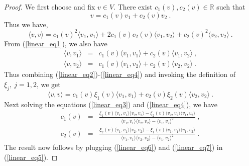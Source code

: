\documentclass[12pt]{amsart}
\theoremstyle{definition}
\newcommand{\R}{\mathbb R}%
\numberwithin{equation}{section}
\begin{document}
\begin{proof}
We first choose and fix $v \in V$. There exist $c_1(v),c_2(v) \in \R$ such that
\begin{equation}  \label{linear_eq1}
v=c_1(v)v_1+c_2(v)v_2\:.
\end{equation}
Thus we have,
\begin{equation} \label{linear_eq2}
\langle v,v \rangle = c_1(v)^2 \langle v_1,v_1 \rangle + 2c_1(v)c_2(v) \langle v_1,v_2 \rangle + c_2(v)^2 \langle v_2,v_2 \rangle  \:.
\end{equation}
From (\ref{linear_eq1}), we also have
\begin{eqnarray} \label{linear_eq3}
\langle v,v_1 \rangle &=& c_1(v) \langle v_1,v_1 \rangle + c_2(v) \langle v_1,v_2 \rangle\:,\\
\langle v,v_2 \rangle &=& c_1(v) \langle v_1,v_2 \rangle + c_2(v) \langle v_2,v_2 \rangle\:. \label{linear_eq4}
\end{eqnarray}
Thus combining (\ref{linear_eq2})-(\ref{linear_eq4}) and invoking the definition of $\xi_j,\:j=1,2$, we get
\begin{equation} \label{linear_eq5}
\langle v,v \rangle = c_1(v)\xi_1(v)\langle v_1,v_1 \rangle + c_2(v)\xi_2(v)\langle v_2,v_2 \rangle \:.
\end{equation}
Next solving the equations (\ref{linear_eq3}) and (\ref{linear_eq4}), we have
\begin{eqnarray} \label{linear_eq6}
c_1(v) &=& \frac{\xi_1(v) \langle v_1,v_1 \rangle \langle v_2,v_2 \rangle - \xi_2(v) \langle v_2,v_2 \rangle \langle v_1,v_2 \rangle }{\langle v_1,v_1 \rangle \langle v_2,v_2 \rangle - \langle v_1,v_2 \rangle^2}\:, \\
c_2(v) &=& \frac{\xi_2(v) \langle v_1,v_1 \rangle \langle v_2,v_2 \rangle - \xi_1(v) \langle v_1,v_1 \rangle \langle v_1,v_2 \rangle }{\langle v_1,v_1 \rangle \langle v_2,v_2 \rangle - \langle v_1,v_2 \rangle^2}\:. \label{linear_eq7}
\end{eqnarray}
The result now follows by plugging (\ref{linear_eq6}) and (\ref{linear_eq7}) in (\ref{linear_eq5}).
\end{proof}
\end{document}
